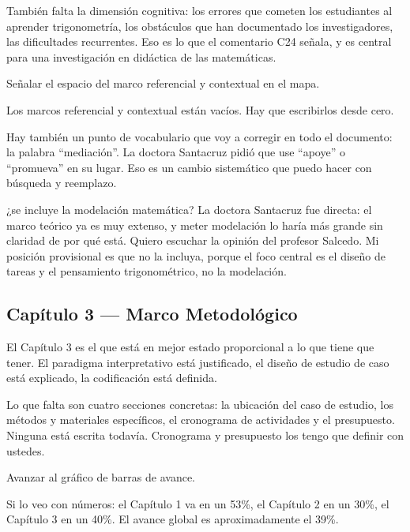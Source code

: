 \documentclass[11pt, letterpaper]{article}
\newenvironment{accion}{%
  \par\smallskip
  \color{GrisAnotacion}\small\itshape\faHandPointRight\enspace
}{%
  \par\smallskip\normalcolor\normalsize\normalfont
}
\begin{document}
También falta la dimensión cognitiva: los errores que cometen los estudiantes al aprender trigonometría, los obstáculos que han documentado los investigadores, las dificultades recurrentes. Eso es lo que el comentario C24 señala, y es central para una investigación en didáctica de las matemáticas.

\begin{accion}
  Señalar el espacio del marco referencial y contextual en el mapa.
\end{accion}

Los marcos referencial y contextual están vacíos. Hay que escribirlos desde cero.

Hay también un punto de vocabulario que voy a corregir en todo el documento: la palabra ``mediación''. La doctora Santacruz pidió que use ``apoye'' o ``promueva'' en su lugar. Eso es un cambio sistemático que puedo hacer con búsqueda y reemplazo.

\begin{decision}{¿se incluye la modelación matemática?}
  La doctora Santacruz fue directa: el marco teórico ya es muy extenso, y meter
  modelación lo haría más grande sin claridad de por qué está. Quiero escuchar
  la opinión del profesor Salcedo.
  Mi posición provisional es que no la incluya, porque el foco central es el
  diseño de tareas y el pensamiento trigonométrico, no la modelación.
\end{decision}

\subsection{Capítulo 3 — Marco Metodológico}

El Capítulo 3 es el que está en mejor estado proporcional a lo que tiene que tener. El paradigma interpretativo está justificado, el diseño de estudio de caso está explicado, la codificación está definida.

Lo que falta son cuatro secciones concretas: la ubicación del caso de estudio, los métodos y materiales específicos, el cronograma de actividades y el presupuesto. Ninguna está escrita todavía. Cronograma y presupuesto los tengo que definir con ustedes.

\begin{accion}
  Avanzar al gráfico de barras de avance.
\end{accion}

Si lo veo con números: el Capítulo 1 va en un 53\%, el Capítulo 2 en un 30\%, el Capítulo 3 en un 40\%. El avance global es aproximadamente el 39\%.
\end{document}
